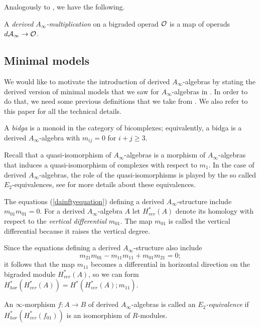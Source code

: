 \documentclass[Thesis.tex]{subfiles}
\begin{document}
Analogously to , we have the following.

\begin{defin}\label{derivedmultiplication}
A \emph{derived $A_\infty$-multiplication} on a bigraded operad ${\mathcal O}$ is a map of operads $d\mathcal{A}_\infty\to{\mathcal O}$.
\end{defin}

\subsection{Minimal models}


We would like to motivate the introduction of derived $A_\infty$-algebras by stating the derived version of minimal models that we saw for $A_\infty$-algebras in . In order to do that, we need some previous definitions that we take from \cite{sagave}. We also refer to this paper for all the technical details.

\begin{defin}
A \emph{bidga} is a monoid in the category of bicomplexes; equivalently, a bidga is a derived $A_\infty$-algebra with $m_{ij} = 0$ for $i + j \geq 3$.
\end{defin}

Recall that a quasi-isomorphism of $A_\infty$-algebras is a morphism of $A_\infty$-algebras that induces a quasi-isomorphism of complexes with respect to $m_1$. In the case of derived $A_\infty$-algebras, the role of the quasi-isomorphisms is played by the so called $E_2$-equivalences, see \cite{spectral} for more details about these equivalences.

\begin{remark}
The equations (\ref{dainftyequation}) defining a derived $A_\infty$-structure include $m_{01}m_{01} = 0$. For a derived $A_\infty$-algebra
$A$ let $H^*_{ver}(A)$ denote its homology with respect to the \emph{vertical differential} $m_{01}$.
The map $m_{01}$ is called the vertical differential because it raises the vertical degree.

Since the equations defining a derived $A_\infty$-structure also include
\[
m_{21}m_{01} - m_{11}m_{11} + m_{01}m_{21} = 0;
\]
it follows that the map $m_{11}$ becomes a differential in horizontal direction on the bigraded
module $H^*_{ver}(A)$, so we can form $H^*_{hor}(H^*_{ver}(A)) = H^*(H^*_{ver}(A);m_{11})$.
\end{remark}

\begin{defin}
An $\infty$-morphism $f : A \to B$ of derived $A_\infty$-algebras
is called an \emph{$E_2$-equivalence} if $H^*_{hor}(H^*_{ver}(f_{01}))$
is an isomorphism of $R$-modules.
\end{defin}
\end{document}
